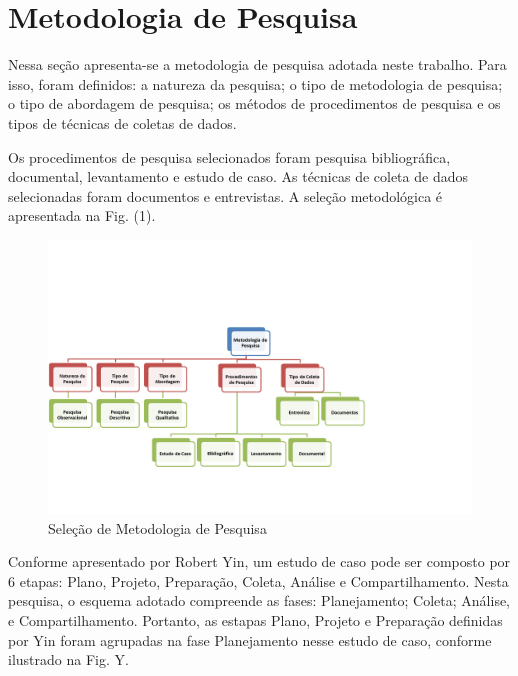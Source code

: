 \section[Metodologia de Pesquisa]{Metodologia de Pesquisa}

Nessa seção apresenta-se a metodologia de pesquisa adotada neste trabalho.
Para isso, foram definidos: a natureza da pesquisa; o tipo de metodologia de pesquisa; o tipo de abordagem de pesquisa; os métodos de
procedimentos de pesquisa e os tipos de técnicas de coletas de dados.

Os procedimentos de pesquisa selecionados foram pesquisa bibliográfica,
documental, levantamento e estudo de caso. As técnicas de coleta de dados selecionadas foram
documentos e entrevistas. A seleção
metodológica é apresentada na Fig. (1).

	\begin{figure}[h]
		\centering
		\label{fig01}
			\includegraphics[scale=0.7]{figuras/metodologiapesquisa.png}
		\caption{Seleção de Metodologia de Pesquisa}
	\end{figure}

Conforme apresentado por Robert Yin, um estudo de caso pode ser composto por 6 etapas: Plano, Projeto, Preparação, Coleta, Análise e Compartilhamento. Nesta pesquisa, o esquema adotado compreende as fases: Planejamento; Coleta; Análise, e Compartilhamento. Portanto, as estapas Plano, Projeto e Preparação definidas por Yin foram agrupadas na fase Planejamento nesse estudo de caso, conforme ilustrado na Fig. Y.


